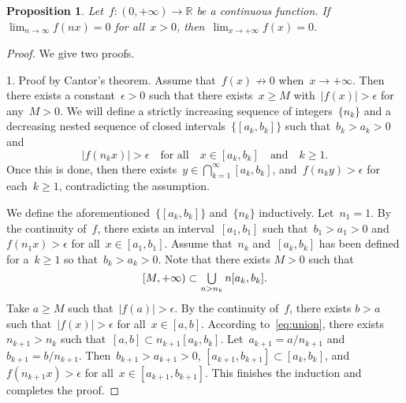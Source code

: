 \documentclass[11pt,a4paper]{article}
\newtheorem{proposition}{Proposition}[section]
\theoremstyle{definition}
\DeclareMathOperator*{\mcup}{\mathsmaller{\bigcup}}
\def\real{\mathbb{R}}
\numberwithin{equation}{section}
\begin{document}
\begin{proposition}
  Let~$f\mathrel{:} (0,+\infty)\to \real$ be a continuous function. If~$\lim_{n\to \infty}f(nx) = 0$ 
   for all~$x>0$, then~$\lim_{x\to +\infty} f(x) = 0$.
\end{proposition}

\begin{proof} We give two proofs. 

  1. Proof by Cantor's theorem. Assume that~$f(x)\nrightarrow 0$ when~$x\to +\infty$. Then there
     exists a constant~$\epsilon > 0$ such that there exists~$x \ge M$ with~$|f(x)|>\epsilon$
     for any~$M > 0$. 
     We will define 
     a strictly increasing sequence of integers~$\{n_k\}$ and
     a decreasing nested sequence of closed intervals~$\{[a_k, b_k]\}$
     such that~$b_k>a_k > 0$ and 
     \begin{equation}
       |f(n_kx)| > \epsilon \quad \text{for all}\quad x \in [a_k, b_k] \quad \text{and}\quad   k\ge 1.
     \end{equation}
     Once this is done, then there exists~$y\in\bigcap_{k=1}^\infty [a_k, b_k]$, and~$f(n_ky)> \epsilon$ for each~$k\ge 1$, contradicting the assumption. 

     We define the aforementioned~$\{[a_k,b_k]\}$ and~$\{n_k\}$ inductively.
     Let~$n_1=1$. By the continuity of~$f$, there exists an interval~$[a_1, b_1]$ such
     that~$b_1>a_1>0$ and~$f(n_1x)> \epsilon$ for all~$x\in [a_1, b_1]$. Assume that~$n_k$
     and~$[a_k, b_k]$ has been defined for a~$k\ge 1$ so that~$b_k>a_k >0$. Note that there exists
     $M>0$ such that
     \begin{equation}
       \label{eq:union}
       [M, +\infty) \subset \mcup_{n> n_k} n[a_k, b_k].
     \end{equation}
     Take $a \ge  M$ such that~$|f(a)|> \epsilon$. By the continuity of~$f$, there exists
     $b>a$ such that~$|f(x)|>\epsilon$ for all~$x\in[a, b]$. According to~\eqref{eq:union},
     there exists $n_{k+1} > n_k$ such that~$[a, b] \subset n_{k+1}[a_k, b_k]$.
     Let~$a_{k+1} = a/n_{k+1}$ and~$b_{k+1} = b/n_{k+1}$. Then~$b_{k+1}>a_{k+1}>0$, $[a_{k+1},
     b_{k+1}]\subset[a_k, b_k]$, and~$f(n_{k+1}x) > \epsilon$ for all~$x\in [a_{k+1}, b_{k+1}]$.
     This finishes the induction and completes the proof.   


\end{proof}
\end{document}
